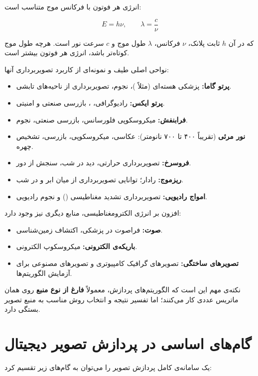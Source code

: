 \documentclass[11pt,a4paper]{article}
\begin{document}
	انرژی هر فوتون با فرکانس موج متناسب است:
	
	\[
	E=h\nu,
	\qquad
	\lambda=\frac{c}{\nu}
	\]
	
	که در آن $h$ ثابت پلانک، $\nu$ فرکانس، $\lambda$ طول موج و $c$ سرعت نور است.
	هرچه طول موج کوتاه‌تر باشد، انرژی هر فوتون بیشتر است.
	
	نواحی اصلی طیف و نمونه‌ای از کاربرد تصویربرداری آنها:
	
	\begin{itemize}
		\item \textbf{پرتو گاما:} پزشکی هسته‌ای (مثلاً )، نجوم، تصویربرداری از ناحیه‌های تابشی.
		\item \textbf{پرتو ایکس:} رادیوگرافی، ، بازرسی صنعتی و امنیتی.
		\item \textbf{فرابنفش:} میکروسکوپی فلورسانس، بازرسی صنعتی، نجوم.
		\item \textbf{نور مرئی} (تقریباً ۴۰۰ تا ۷۰۰ نانومتر): عکاسی، میکروسکوپی، بازرسی، تشخیص چهره.
		\item \textbf{فروسرخ:} تصویربرداری حرارتی، دید در شب، سنجش از دور.
		\item \textbf{ریزموج:} رادار؛ توانایی تصویربرداری از میان ابر و در شب.
		\item \textbf{امواج رادیویی:} تصویربرداری تشدید مغناطیسی () و نجوم رادیویی.
	\end{itemize}
	
	افزون بر انرژی الکترومغناطیسی، منابع دیگری نیز وجود دارد:
	
	\begin{itemize}
		\item \textbf{صوت:} فراصوت در پزشکی، اکتشاف زمین‌شناسی.
		\item \textbf{باریکه‌ی الکترونی:} میکروسکوپ الکترونی.
		\item \textbf{تصویرهای ساختگی:} تصویرهای گرافیک کامپیوتری و تصویرهای مصنوعی برای آزمایش الگوریتم‌ها.
	\end{itemize}
	
	نکته‌ی مهم این است که الگوریتم‌های پردازش، معمولاً \textbf{فارغ از نوع منبع} روی همان
	ماتریس عددی کار می‌کنند؛ اما تفسیر نتیجه و انتخاب روش مناسب به منبع تصویر بستگی دارد.
	
	
	\section{گام‌های اساسی در پردازش تصویر دیجیتال}
	
	یک سامانه‌ی کامل پردازش تصویر را می‌توان به گام‌های زیر تقسیم کرد:
	
\end{document}
